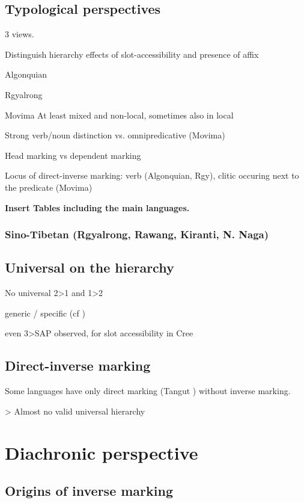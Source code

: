 \documentclass[twoside,a4paper,11pt]{article}
\begin{document}
\subsection{Typological perspectives} \label{sec:typology}
3 views.


Distinguish hierarchy effects of slot-accessibility and presence of affix \citet{zuniga06}

\citet{silverstein76}

Algonquian

Rgyalrong \citet{jacques10inverse}

Movima
At least mixed and non-local, sometimes also in local
\citet{creissels08alignment}


Strong verb/noun distinction vs. omnipredicative (Movima)

Head marking vs dependent marking

Locus of direct-inverse marking: verb (Algonquian, Rgy), clitic occuring next to the predicate (Movima)

\textbf{Insert Tables including the main languages.}

\subsubsection{Sino-Tibetan (Rgyalrong, Rawang, Kiranti, N. Naga)}

\subsection{Universal on the hierarchy}
No universal 2>1 and 1>2

generic / specific (cf \citet{jacques12demotion})

even 3>SAP observed,  for slot accessibility in Cree \citet{zuniga06}

\subsection{Direct-inverse marking}
Some languages have only direct marking (Tangut  \citet{jacques09tangutverb}) without inverse marking.

> Almost no valid universal hierarchy

\section{Diachronic perspective}
\subsection{Origins of inverse marking}
\end{document}
